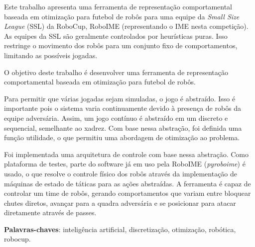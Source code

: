 \setlength{\absparsep}{18pt} %
\begin{resumo}


  Este trabalho apresenta uma ferramenta de representação comportamental baseada
  em otimização para futebol de robôs para uma equipe da \textit{Small Size
  League} (SSL) da RoboCup, RoboIME (representando o IME nesta competição).  As
  equipes da SSL são geralmente controlados por heurísticas puras.  Isso
  restringe o movimento dos robôs para um conjunto fixo de comportamentos,
  limitando as possíveis jogadas.

  O objetivo deste trabalho é desenvolver uma ferramenta de representação
  comportamental baseada em otimização para futebol de robôs.

  Para permitir que várias jogadas sejam simuladas, o jogo é abstraído.  Isso é
  importante pois o sistema varia continuamente devido à presença de robôs da
  equipe adversária.  Assim, um jogo contínuo é abstraído em um discreto e
  sequencial, semelhante ao xadrez.  Com base nessa abstração, foi definida uma
  função utilidade, o que permitiu uma abordagem de otimização ao problema.

  Foi implementada uma arquitetura de controle com base nessa abstração.  Como
  plataforma de testes, parte do software já em uso pela RoboIME
  (\textit{pyroboime}) é usado, o que resolve o controle físico dos robôs
  através da implementação de máquinas de estado de táticas para as ações
  abstraídas.  A ferramenta é capaz de controlar um time de robôs, gerando
  comportamentos que variam entre bloquear chutes diretos, avançar para a quadra
  adversária e se posicionar para atacar diretamente através de passes.

  \textbf{Palavras-chaves}: inteligência artificial, discretização, otimização, robótica, robocup.
\end{resumo}

